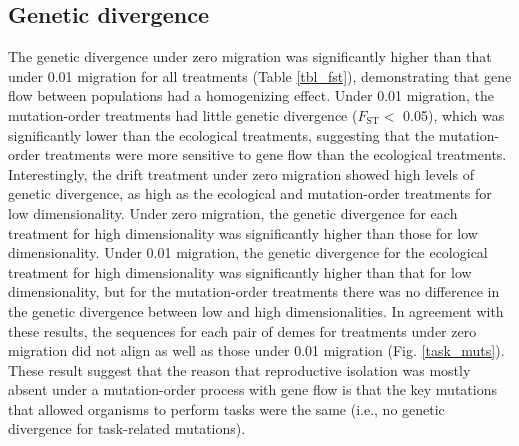 \begin{doublespace}
\subsection{Genetic divergence}

The genetic divergence under zero migration was significantly higher
than that under 0.01 migration for all treatments (Table \ref{tbl_fst}),
demonstrating that gene flow between populations had a homogenizing effect.
%
Under 0.01 migration, the mutation-order treatments had little genetic
divergence ($F_{\mathrm{ST}} <$ 0.05), which was significantly lower than the
ecological treatments, suggesting that the mutation-order treatments were more
sensitive to gene flow than the ecological treatments.
%
Interestingly, the drift treatment under zero migration showed high levels of
genetic divergence, as high as the ecological and mutation-order treatments for
low dimensionality.
%
Under zero migration, the genetic divergence for each treatment for high
dimensionality was significantly higher than those for low dimensionality.
%
Under 0.01 migration, the genetic divergence for the ecological treatment for
high dimensionality was significantly higher than that for low dimensionality,
but for the mutation-order treatments there was no difference in the genetic
divergence between low and high dimensionalities.
%
In agreement with these results,
the sequences for each pair of demes for treatments
under zero migration did not align as well as those
under 0.01 migration (Fig. \ref{task_muts}).
%
These result suggest that the reason that reproductive isolation
was mostly absent under a mutation-order process with gene flow
is that the key mutations that allowed organisms to perform tasks were the same
(i.e., no genetic divergence for task-related mutations).




\end{doublespace}

